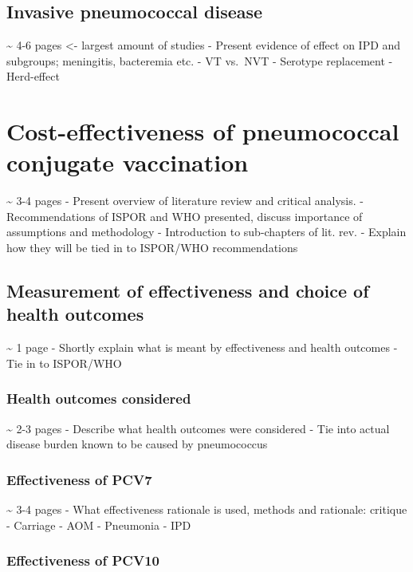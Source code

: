 \documentclass[]{book}
\theoremstyle{definition}
\theoremstyle{definition}
\theoremstyle{definition}
\theoremstyle{remark}
\begin{document}
\subsection{Invasive pneumococcal
disease}\label{invasive-pneumococcal-disease-1}

\textasciitilde{} 4-6 pages \textless{}- largest amount of studies -
Present evidence of effect on IPD and subgroups; meningitis, bacteremia
etc. - VT vs.~NVT - Serotype replacement - Herd-effect

\section{Cost-effectiveness of pneumococcal conjugate
vaccination}\label{cost-effectiveness-of-pneumococcal-conjugate-vaccination}

\textasciitilde{} 3-4 pages - Present overview of literature review and
critical analysis. - Recommendations of ISPOR and WHO presented, discuss
importance of assumptions and methodology - Introduction to sub-chapters
of lit. rev. - Explain how they will be tied in to ISPOR/WHO
recommendations

\subsection{Measurement of effectiveness and choice of health
outcomes}\label{measurement-of-effectiveness-and-choice-of-health-outcomes}

\textasciitilde{} 1 page - Shortly explain what is meant by
effectiveness and health outcomes - Tie in to ISPOR/WHO

\subsubsection{Health outcomes
considered}\label{health-outcomes-considered}

\textasciitilde{} 2-3 pages - Describe what health outcomes were
considered - Tie into actual disease burden known to be caused by
pneumococcus

\subsubsection{Effectiveness of PCV7}\label{effectiveness-of-pcv7}

\textasciitilde{} 3-4 pages - What effectiveness rationale is used,
methods and rationale: critique - Carriage - AOM - Pneumonia - IPD

\subsubsection{Effectiveness of PCV10}\label{effectiveness-of-pcv10}
\end{document}
